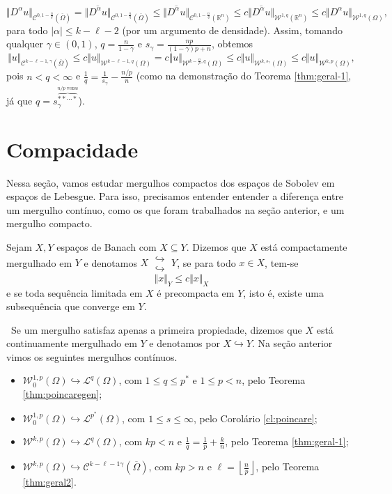 \documentclass[a4paper, 11pt]{book}
\theoremstyle{definition}
\newcommand{\obs}{\noindent{\textbf{\textcolor{black}{\sffamily Observação:}}}~}
\newcommand{\bR}{\mathbb{R}}
\newcommand{\cC}{\mathcal{C}}
\newcommand{\cL}{\mathcal{L}}
\newcommand{\cW}{\mathcal{W}}
\newcommand{\doublehookrightarrow}{\;\substack{\hookrightarrow \\ \hookrightarrow}\;}
\begin{document}
\begin{prf}
    \[
        \Vert D^\alpha u \Vert_{\cC^{0,1-\frac{n}{q}}(\overline\Omega)} = \Vert \overline{D^\alpha u} \Vert_{\cC^{0,1-\frac{n}{q}}(\overline\Omega)} \leqslant \Vert \overline{D^\alpha u} \Vert_{\cC^{0,1 - \frac{n}{q}}(\bR^n)} \leqslant c \Vert \overline{D^\alpha u} \Vert_{\cW^{1,q}(\bR^n)} \leqslant c \Vert D^\alpha u \Vert_{\cW^{1,q}(\Omega)},
    \]
    para todo $|\alpha| \leqslant k - \ell - 2$ (por um argumento de densidade).
    Assim, tomando qualquer $\gamma \in (0,1)$, $q = \frac{n}{1 - \gamma}$ e $s_\gamma = \frac{np}{(1- \gamma)p + n}$, obtemos
    \[
        \Vert u \Vert_{\cC^{k-\ell-1,\gamma}(\overline\Omega)} \leqslant c\Vert u \Vert_{\cW^{k-\ell-1,q}(\Omega)} = c \Vert u \Vert_{\cW^{k-\frac{n}{p},q}(\Omega)} \leqslant c \Vert u \Vert_{\cW^{k,s_\gamma}(\Omega)} \leqslant c \Vert u \Vert_{\cW^{k,p}(\Omega)},
    \]
    pois $n < q < \infty$ e $\frac{1}{q} = \frac{1}{s_\gamma} - \frac{n/p}{n}$ (como na demonstração do Teorema \ref{thm:geral-1}, já que $q = s_\gamma^{\overbrace{**\cdots*}^{n/p \text{ vezes}}}$).
\end{prf}

\section{Compacidade}

Nessa seção, vamos estudar mergulhos compactos dos espaços de Sobolev em espaços de Lebesgue.
Para isso, precisamos entender entender a diferença entre um mergulho contínuo, como os que foram trabalhados na seção anterior, e um mergulho compacto.

\begin{dbox}
    Sejam $X, Y$ espaços de Banach com $X \subseteq Y$. Dizemos que $X$ está compactamente mergulhado em $Y$ e denotamos $X \doublehookrightarrow Y$,
    se para todo $x \in X$, tem-se
    \[
        \Vert x \Vert_{Y} \leqslant c \Vert x \Vert_X
    \]
    e se toda sequência limitada em $X$ é precompacta em $Y$, isto é, existe uma subsequência que converge em $Y$.
\end{dbox}

\obs Se um mergulho satisfaz apenas a primeira propiedade, dizemos que $X$ está continuamente mergulhado em $Y$ e denotamos por $X \hookrightarrow Y$. Na seção anterior vimos os seguintes mergulhos contínuos.
\begin{itemize}
    \item $\cW^{1,p}_0(\Omega) \hookrightarrow \cL^q(\Omega)$, com $1 \leqslant q \leqslant p^*$ e $1 \leqslant p < n$, pelo Teorema \ref{thm:poincaregen};
    \item $\cW^{1,p}_0(\Omega) \hookrightarrow \cL^{p^*}(\Omega)$, com $1 \leqslant s \leqslant \infty$, pelo Corolário \ref{cl:poincare};
    \item $\cW^{k,p}(\Omega) \hookrightarrow \cL^q(\Omega)$, com $kp < n$ e $\frac{1}{q} = \frac{1}{p} + \frac{k}{n}$, pelo Teorema \ref{thm:geral-1};
    \item $\cW^{k,p}(\Omega) \hookrightarrow \cC^{k-\ell-1\gamma}(\overline\Omega)$, com $kp > n$ e $\ell = \left\lfloor \frac{n}{p} \right\rfloor$, pelo Teorema \ref{thm:geral2}.
\end{itemize}
\end{document}
